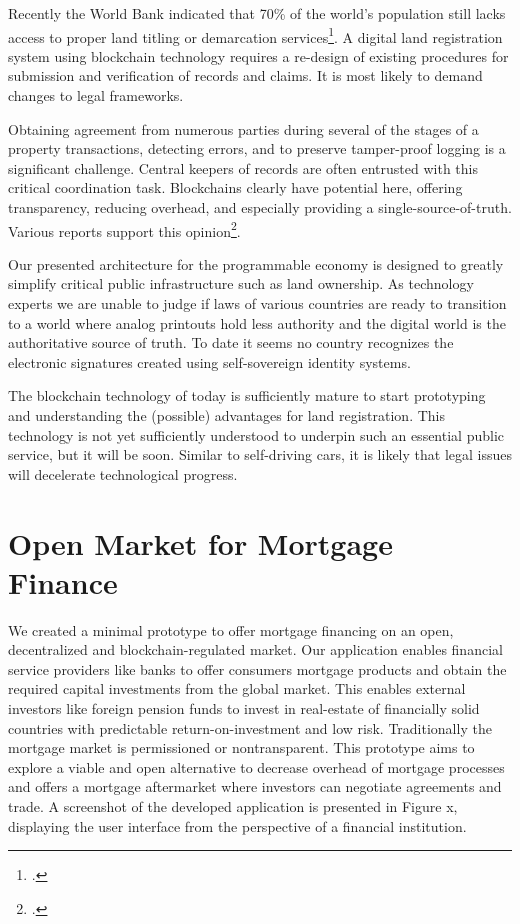 \documentclass[USenglish]{article}
\begin{document}
Recently the World Bank indicated that 70\% of the world’s population still lacks access to proper land titling or demarcation services\footcite{ieglandadministration}.
A digital land registration system using blockchain technology requires a re-design of existing procedures for submission and verification of records and claims.
It is most likely to demand changes to legal frameworks.

Obtaining agreement from numerous parties during several of the stages of a property transactions, detecting errors, and to preserve tamper-proof logging is a significant challenge.
Central keepers of records are often entrusted with this critical coordination task.
Blockchains clearly have potential here, offering transparency, reducing overhead, and especially providing a single-source-of-truth.
Various reports support this opinion\footcite{deloitteblockchain}.

Our presented architecture for the programmable economy is designed to greatly simplify critical public infrastructure such as land ownership.
As technology experts we are unable to judge if laws of various countries are ready to transition to a world where analog printouts hold less authority and the digital world is the authoritative source of truth.
To date it seems no country recognizes the electronic signatures created using self-sovereign identity systems.

The blockchain technology of today is sufficiently mature to start prototyping and understanding the (possible) advantages for land registration. 
This technology is not yet sufficiently understood to underpin such an essential public service, but it will be soon.
Similar to self-driving cars, it is likely that legal issues will decelerate technological progress.

\section{Open Market for Mortgage Finance}

We created a minimal prototype to offer mortgage financing on an open, decentralized and blockchain-regulated market.
Our application enables financial service providers like banks to offer consumers mortgage products and obtain the required capital investments from the global market.
This enables external investors like foreign pension funds to invest in real-estate of financially solid countries with predictable return-on-investment and low risk.
Traditionally the mortgage market is permissioned or nontransparent.
This prototype aims to explore a viable and open alternative to decrease overhead of mortgage processes and offers a mortgage aftermarket where investors can negotiate agreements and trade.
A screenshot of the developed application is presented in Figure x, displaying the user interface from the perspective of a financial institution.
\end{document}
